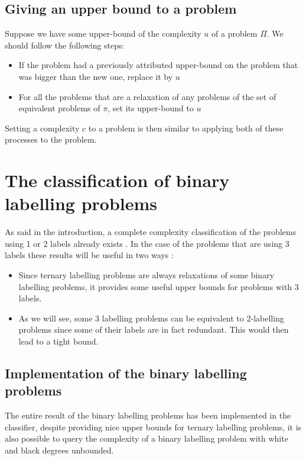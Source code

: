 \subsection{Giving an upper bound to a problem}
Suppose we have some upper-bound of the complexity $u$ of a problem $\Pi$. We should follow the following steps:
\begin{itemize}
    \item If the problem had a previously attributed upper-bound on the problem that was bigger than the new one, replace it by $u$
    \item For all the problems that are a relaxation of any problems of the set of equivalent problems of $\pi$, set its upper-bound to $u$
\end{itemize}
Setting a complexity $c$ to a problem is then similar to applying both of these processes to the problem.


\section{The classification of binary labelling problems}\label{sec:BLP}
As said in the introduction, a complete complexity classification of the problems using 1 or 2 labels already exists \cite{1}. In the case of the problems that are using 3 labels these results will be useful in two ways :
\begin{itemize}
    \item Since ternary labelling problems are always relaxations of some binary labelling problems, it provides some useful upper bounds for problems with 3 labels.
    \item As we will see, some 3 labelling problems can be equivalent to 2-labelling problems since some of their labels are in fact redundant. This would then lead to a tight bound.
\end{itemize}
\subsection{Implementation of the binary labelling problems}
The entire result of the binary labelling problems has been implemented in the classifier, despite providing nice upper bounds for ternary labelling problems, it is also possible to query the complexity of a binary labelling problem with white and black degrees unbounded.
